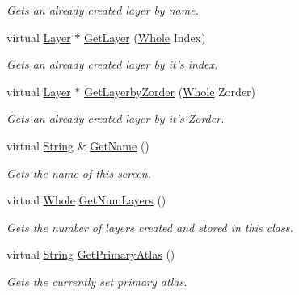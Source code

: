 \begin{DoxyCompactItemize}
\begin{DoxyCompactList}\small\item\em Gets an already created layer by name. \item\end{DoxyCompactList}\item 
virtual \hyperlink{classphys_1_1UI_1_1Layer}{Layer} $\ast$ \hyperlink{classphys_1_1UI_1_1Screen_a7aa76ca0a45c7b78d1872388bf6da4dc}{GetLayer} (\hyperlink{namespacephys_a460f6bc24c8dd347b05e0366ae34f34a}{Whole} Index)
\begin{DoxyCompactList}\small\item\em Gets an already created layer by it's index. \item\end{DoxyCompactList}\item 
virtual \hyperlink{classphys_1_1UI_1_1Layer}{Layer} $\ast$ \hyperlink{classphys_1_1UI_1_1Screen_a206f87f758f708f297c0d6311ed4781e}{GetLayerbyZorder} (\hyperlink{namespacephys_a460f6bc24c8dd347b05e0366ae34f34a}{Whole} Zorder)
\begin{DoxyCompactList}\small\item\em Gets an already created layer by it's Zorder. \item\end{DoxyCompactList}\item 
virtual \hyperlink{namespacephys_aa03900411993de7fbfec4789bc1d392e}{String} \& \hyperlink{classphys_1_1UI_1_1Screen_a25429da07fa8f04a3183265bd8c5d3d7}{GetName} ()
\begin{DoxyCompactList}\small\item\em Gets the name of this screen. \item\end{DoxyCompactList}\item 
virtual \hyperlink{namespacephys_a460f6bc24c8dd347b05e0366ae34f34a}{Whole} \hyperlink{classphys_1_1UI_1_1Screen_a93d30de6a8856a6df1018ee9ff3025df}{GetNumLayers} ()
\begin{DoxyCompactList}\small\item\em Gets the number of layers created and stored in this class. \item\end{DoxyCompactList}\item 
virtual \hyperlink{namespacephys_aa03900411993de7fbfec4789bc1d392e}{String} \hyperlink{classphys_1_1UI_1_1Screen_a2e1c1929e23577e95d6226a58b7602da}{GetPrimaryAtlas} ()
\begin{DoxyCompactList}\small\item\em Gets the currently set primary atlas. \item\end{DoxyCompactList}\item 

\end{DoxyCompactItemize}
